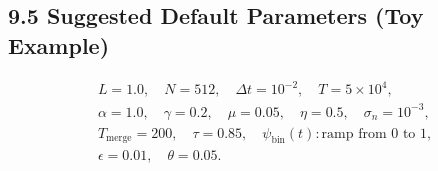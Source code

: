 \documentclass[11pt]{article}
\theoremstyle{plain}
\begin{document}
\subsection*{9.5 Suggested Default Parameters (Toy Example)}

\[
\begin{aligned}
&L=1.0,\quad N=512,\quad \Delta t=10^{-2},\quad T=5\times 10^4,\\
&\alpha=1.0,\quad \gamma=0.2,\quad \mu=0.05,\quad \eta=0.5,\quad \sigma_n=10^{-3},\\
&T_{\text{merge}}=200,\quad \tau=0.85,\quad \psi_{\text{bin}}(t): \text{ramp from 0 to 1},\\
&\epsilon=0.01,\quad \theta=0.05.
\end{aligned}
\]


\newpage


\end{document}
